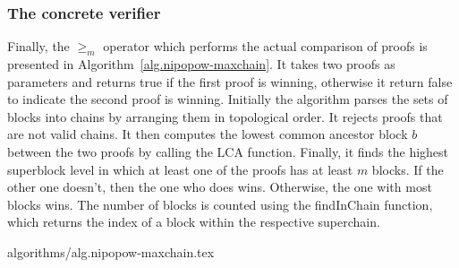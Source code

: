 \subsubsection{The concrete verifier}

Finally, the $\geq_m$ operator which performs the actual comparison of proofs
is presented in Algorithm~\ref{alg.nipopow-maxchain}. It takes two proofs as
parameters and returns true if the first proof is winning, otherwise it return
false to indicate the second proof is winning. Initially the algorithm parses
the sets of blocks into chains by arranging them in topological order. It
rejects proofs that are not valid chains. It then computes the lowest common
ancestor block $b$ between the two proofs by calling the LCA function. Finally,
it finds the highest superblock level in which at least one of the proofs has
at least $m$ blocks. If the other one doesn't, then the one who does wins.
Otherwise, the one with most blocks wins. The number of blocks is counted using
the findInChain function, which returns the index of a block within the
respective superchain.

{algorithms/alg.nipopow-maxchain.tex}
